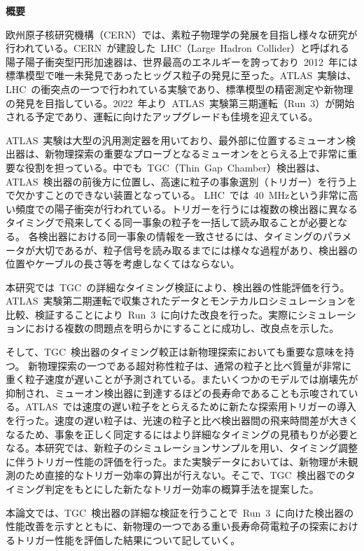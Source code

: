 \begin{center}
    \textbf{概要}
\end{center}
\thispagestyle{empty}
\vspace{10pt}
欧州原子核研究機構（CERN）では、素粒子物理学の発展を目指し様々な研究が行われている。CERN~が建設した~LHC（Large~Hadron~Collider）と呼ばれる陽子陽子衝突型円形加速器は、世界最高のエネルギーを誇っており~2012~年には標準模型で唯一未発見であったヒッグス粒子の発見に至った。ATLAS~実験は、LHC~の衝突点の一つで行われている実験であり、標準模型の精密測定や新物理の発見を目指している。2022~年より~ATLAS~実験第三期運転（Run~3）が開始される予定であり、運転に向けたアップグレードも佳境を迎えている。

ATLAS~実験は大型の汎用測定器を用いており、最外部に位置するミューオン検出器は、新物理探索の重要なプローブとなるミューオンをとらえる上で非常に重要な役割を担っている。中でも~TGC（Thin~Gap~Chamber）検出器は、ATLAS~検出器の前後方に位置し、高速に粒子の事象選別（トリガー）を行う上で欠かすことのできない装置となっている。
LHC~では~40~MHzという非常に高い頻度での陽子衝突が行われている。トリガーを行うには複数の検出器に異なるタイミングで飛来してくる同一事象の粒子を一括して読み取ることが必要となる。
各検出器における同一事象の情報を一致させるには、タイミングのパラメータが大切であるが、粒子信号を読み取るまでには様々な過程があり、検出器の位置やケーブルの長さ等を考慮しなくてはならない。

本研究では~TGC~の詳細なタイミング検証により、検出器の性能評価を行う。ATLAS~実験第二期運転で収集されたデータとモンテカルロシミュレーションを比較、検証することにより~Run~3~に向けた改良を行った。実際にシミュレーションにおける複数の問題点を明らかにすることに成功し、改良点を示した。

そして、TGC~検出器のタイミング較正は新物理探索においても重要な意味を持つ。
新物理探索の一つである超対称性粒子は、通常の粒子と比べ質量が非常に重く粒子速度が遅いことが予測されている。またいくつかのモデルでは崩壊先が抑制され、ミューオン検出器に到達するほどの長寿命であることも示唆されている。ATLAS~では速度の遅い粒子をとらえるために新たな探索用トリガーの導入を行った。速度の遅い粒子は、光速の粒子と比べ検出器間の飛来時間差が大きくなるため、事象を正しく同定するにはより詳細なタイミングの見積もりが必要となる。本研究では、新粒子のシミュレーションサンプルを用い、タイミング調整に伴うトリガー性能の評価を行った。また実験データにおいては、新物理が未観測のため直接的なトリガー効率の算出が行えない。そこで、TGC~検出器でのタイミング判定をもとにした新たなトリガー効率の概算手法を提案した。

本論文では、TGC~検出器の詳細な検証を行うことで~Run~3~に向けた検出器の性能改善を示すとともに、新物理の一つである重い長寿命荷電粒子の探索におけるトリガー性能を評価した結果について記していく。
